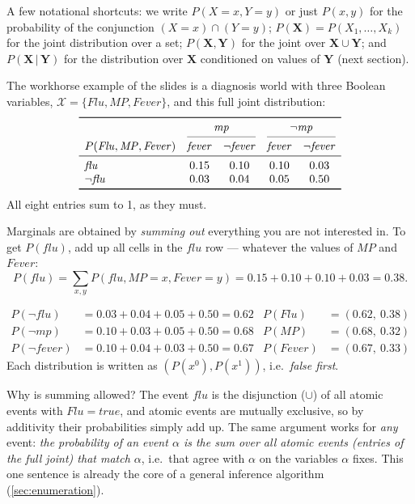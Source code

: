 \documentclass[11pt, oneside]{book}
\newcommand{\Prob}{\mathbb{P}}           %
\newcommand{\given}{\,\vert\,}           %
\newcommand{\Xall}{\mathcal{X}}          %
\newcommand{\bX}{\mathbf{X}}  \newcommand{\bY}{\mathbf{Y}}
\newcommand{\vn}[1]{\mathit{#1}}         %
\begin{document}
A few notational shortcuts: we write $P(X = x, Y = y)$ or just $P(x, y)$ for
the probability of the conjunction $(X = x) \cap (Y = y)$; $P(\bX) =
P(X_1, \ldots, X_k)$ for the joint distribution over a set; $P(\bX, \bY)$ for
the joint over $\bX \cup \bY$; and $P(\bX \given \bY)$ for the distribution
over $\bX$ conditioned on values of $\bY$ (next section).

The workhorse example of the slides is a diagnosis world with three Boolean
variables, $\Xall = \{\vn{Flu}, \vn{MP}, \vn{Fever}\}$, and this full joint
distribution:
\begin{equation}
\label{eq:flu-mp-fever}
\begin{array}{lcccc}
\toprule
 & \multicolumn{2}{c}{\vn{mp}} & \multicolumn{2}{c}{\neg\vn{mp}} \\
\cmidrule(lr){2-3} \cmidrule(lr){4-5}
P(\vn{Flu}, \vn{MP}, \vn{Fever}) & \vn{fever} & \neg\vn{fever} & \vn{fever} & \neg\vn{fever} \\
\midrule
\vn{flu}      & 0.15 & 0.10 & 0.10 & 0.03 \\
\neg\vn{flu}  & 0.03 & 0.04 & 0.05 & 0.50 \\
\bottomrule
\end{array}
\end{equation}
All eight entries sum to 1, as they must.

Marginals are obtained by \emph{summing out} everything you are not interested
in. To get $P(\vn{flu})$, add up all cells in the $\vn{flu}$ row --- whatever
the values of $\vn{MP}$ and $\vn{Fever}$:
\[
P(\vn{flu}) = \sum_{x, y} P(\vn{flu}, \vn{MP} = x, \vn{Fever} = y)
= 0.15 + 0.10 + 0.10 + 0.03 = 0.38 .
\]

\begin{exbox}[title={All three marginals of table \eqref{eq:flu-mp-fever}}]
\begin{align*}
P(\neg\vn{flu}) &= 0.03 + 0.04 + 0.05 + 0.50 = 0.62
  & P(\vn{Flu}) &= (0.62,\ 0.38) \\
P(\neg\vn{mp}) &= 0.10 + 0.03 + 0.05 + 0.50 = 0.68
  & P(\vn{MP}) &= (0.68,\ 0.32) \\
P(\neg\vn{fever}) &= 0.10 + 0.04 + 0.03 + 0.50 = 0.67
  & P(\vn{Fever}) &= (0.67,\ 0.33)
\end{align*}
Each distribution is written as $(P(x^0), P(x^1))$, i.e.\ \emph{false first}.
\end{exbox}

Why is summing allowed? The event $\vn{flu}$ is the disjunction ($\cup$) of all
atomic events with $\vn{Flu} = \vn{true}$, and atomic events are mutually
exclusive, so by additivity their probabilities simply add up. The same
argument works for \emph{any} event: \emph{the probability of an event
$\alpha$ is the sum over all atomic events (entries of the full joint) that
match $\alpha$}, i.e.\ that agree with $\alpha$ on the variables $\alpha$ fixes.
This one sentence is already the core of a general inference algorithm
(\cref{sec:enumeration}).
\end{document}
